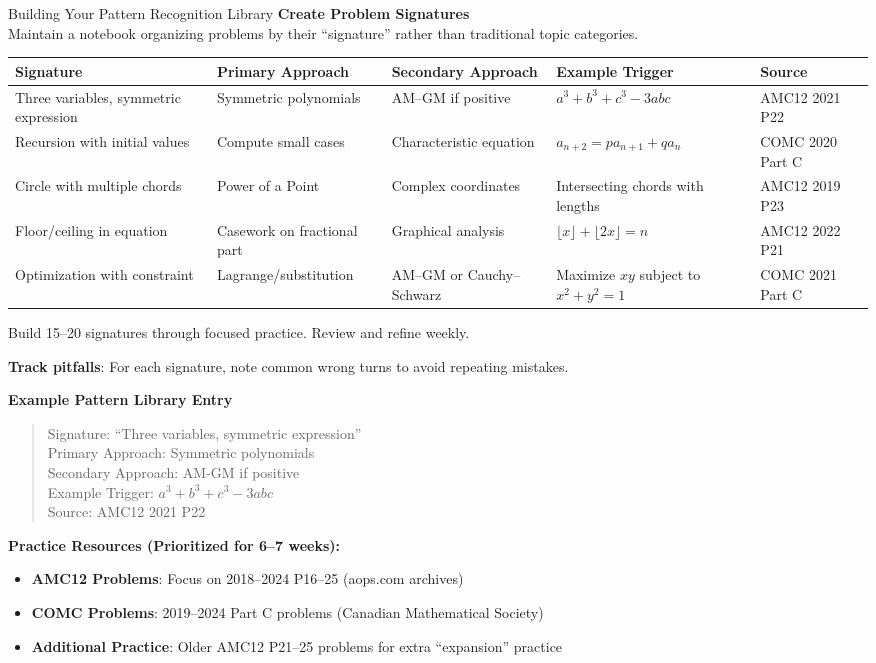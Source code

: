 \documentclass{article}
\begin{document}
\begin{trainingbox}{Building Your Pattern Recognition Library}
\textbf{Create Problem Signatures}\\
Maintain a notebook organizing problems by their ``signature'' rather than traditional topic categories.

\begin{center}
\begin{tabularx}{\textwidth}{@{}X|X|X|X|X@{}}
\toprule
\textbf{Signature} & \textbf{Primary Approach} & \textbf{Secondary Approach} & \textbf{Example Trigger} & \textbf{Source} \\
\hline
Three variables, symmetric expression & Symmetric polynomials & AM--GM if positive & $a^3 + b^3 + c^3 - 3abc$ & AMC12 2021 P22 \\
\hline 
Recursion with initial values & Compute small cases & Characteristic equation & $a_{n+2} = pa_{n+1} + qa_n$ & COMC 2020 Part C \\
\hline
Circle with multiple chords & Power of a Point & Complex coordinates & Intersecting chords with lengths & AMC12 2019 P23 \\
\hline
Floor/ceiling in equation & Casework on fractional part & Graphical analysis & $\lfloor x \rfloor + \lfloor 2x \rfloor = n$ & AMC12 2022 P21 \\
\hline
Optimization with constraint & Lagrange/substitution & AM--GM or Cauchy--Schwarz & Maximize $xy$ subject to $x^2 + y^2 = 1$ & COMC 2021 Part C \\
\hline
\end{tabularx}
\end{center}

Build 15--20 signatures through focused practice. Review and refine weekly.

\textbf{Track pitfalls}: For each signature, note common wrong turns to avoid repeating mistakes.

\textbf{Example Pattern Library Entry}
\begin{quote}\small\ttfamily
Signature: ``Three variables, symmetric expression''\\
Primary Approach: Symmetric polynomials\\
Secondary Approach: AM-GM if positive\\
Example Trigger: $a^3 + b^3 + c^3 - 3abc$\\
Source: AMC12 2021 P22
\end{quote}

\textbf{Practice Resources (Prioritized for 6--7 weeks):}
\begin{itemize}[nosep]
    \item \textbf{AMC12 Problems}: Focus on 2018--2024 P16--25 (aops.com archives)
    \item \textbf{COMC Problems}: 2019--2024 Part C problems (Canadian Mathematical Society)
    \item \textbf{Additional Practice}: Older AMC12 P21--25 problems for extra ``expansion'' practice
\end{itemize}


\end{trainingbox}
\end{document}
